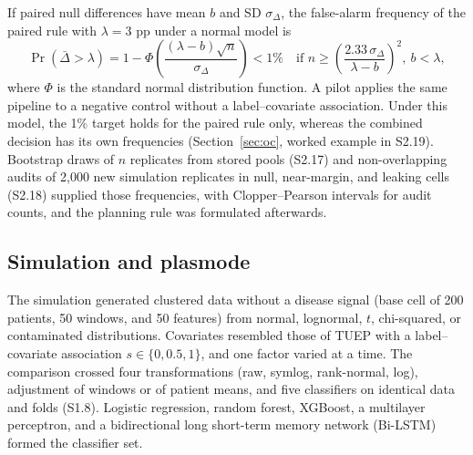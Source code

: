 \documentclass[final,1p,times]{elsarticle}
\begin{document}
If paired null differences have mean $b$ and SD $\sigma_{\Delta}$, the false-alarm frequency of the paired rule with $\lambda=3$ pp under a normal model is
\begin{equation}\label{eq:n}
\Pr\left(\bar{\Delta}>\lambda\right)=1-\Phi\left(\frac{(\lambda-b)\sqrt{n}}{\sigma_{\Delta}}\right)<1\%\quad\text{if } n\geq\left(\frac{2.33\,\sigma_{\Delta}}{\lambda-b}\right)^{2},\ b<\lambda,
\end{equation}
where $\Phi$ is the standard normal distribution function. A pilot applies the same pipeline to a negative control without a label--covariate association. Under this model, the 1\% target holds for the paired rule only, whereas the combined decision has its own frequencies (Section~\ref{sec:oc}, worked example in S2.19). Bootstrap draws of $n$ replicates from stored pools (S2.17) and non-overlapping audits of 2,000 new simulation replicates in null, near-margin, and leaking cells (S2.18) supplied those frequencies, with Clopper--Pearson intervals for audit counts, and the planning rule was formulated afterwards.

\subsection{Simulation and plasmode}\label{sec:metode_peta}

The simulation generated clustered data without a disease signal (base cell of 200 patients, 50 windows, and 50 features) from normal, lognormal, $t$, chi-squared, or contaminated distributions. Covariates resembled those of TUEP with a label--covariate association $s\in\{0,0.5,1\}$, and one factor varied at a time. The comparison crossed four transformations (raw, symlog, rank-normal, log), adjustment of windows or of patient means, and five classifiers on identical data and folds (S1.8). Logistic regression, random forest, XGBoost, a multilayer perceptron, and a bidirectional long short-term memory network (Bi-LSTM) formed the classifier set.
\end{document}
